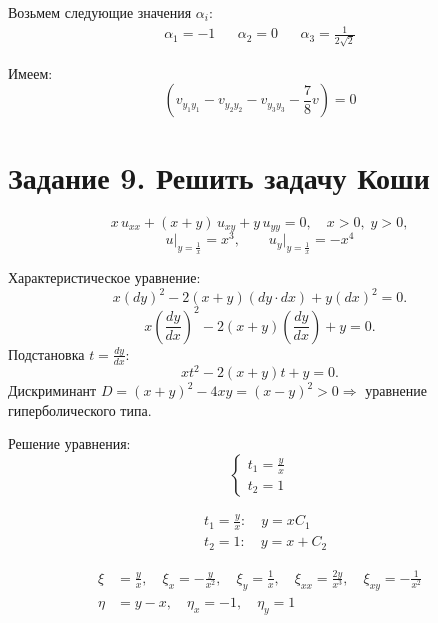 \documentclass[a4paper,12pt]{article}
\begin{document}
    Возьмем следующие значения $\alpha_i$:
    \begin{align*}
        &\alpha_1 = -1& &\alpha_2 = 0& &\alpha_3 = \frac{1}{2\sqrt{2}}&
    \end{align*}

    Имеем:
    $$(v_{y_1y_1} - v_{y_2y_2} - v_{y_3y_3} - \frac{7}{8}v) = 0$$

\section{Задание 9. Решить задачу Коши}
        
        
        \begin{equation*}
            x\,u_{xx} + (x+y)\,u_{xy} + y\,u_{yy}=0,\quad x>0,\;y>0,
        \end{equation*}
        \[
        u \Big|_{y=\frac{1}{x}} = x^3, \quad \quad  u_{y} \Big|_{y=\frac{1}{x}} = -x^4
        \]
        
        Характеристическое уравнение:
        \[
        x\left({dy}\right)^2 - 2(x+y)\left({dy}\cdot{dx}\right) + y\left({dx}\right)^2=0.
        \]
        \[
        x\left(\frac{dy}{dx}\right)^2 - 2(x+y)\left(\frac{dy}{dx}\right) + y=0.
        \]
        Подстановка $t = \frac{dy}{dx}$:
        \[
        xt^2 - 2(x+y)t + y=0.
        \]
        Дискриминант $D = (x+y)^2 - 4xy = (x-y)^2> 0 \Rightarrow$ уравнение гиперболического типа.
        
        Решение уравнения:
        \begin{equation*}
            \begin{cases}
            t_1 = \frac{y}{x} \\
            t_2 = 1
            \end{cases}
        \end{equation*}
        
        \begin{align*}
            &t_1 = \frac{y}{x}: \quad y = xC_1 \\
            &t_2 = 1: \quad y = x + C_2
        \end{align*}
        
        \begin{align*}
            \xi &= \frac{y}{x} , \quad \xi_x = -\frac{y}{x^2},  \quad \xi_y = \frac{1}{x},   \quad  \xi_{xx} = \frac{2y}{x^3},  \quad  \xi_{xy} = -\frac{1}{x^2} \\
            \eta &= y - x, \quad \eta_x = -1,  \quad \eta_y = 1
        \end{align*}
        
\end{document}
